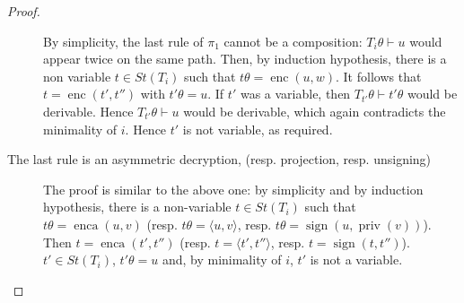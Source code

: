 \documentclass[acmtocl,acmnow]{acmtrans2m}
\newcommand{\pair}[2]{\langle{#1},{#2}\rangle}
\newcommand{\st}{\mathit{St}}
\newcommand{\penc}[2]{\operatorname{enc}(#1,#2)}
\newcommand{\enca}{\operatorname{enca}}
\newcommand{\sign}{\operatorname{sign}}
\newcommand{\pub}[1]{#1}
\newcommand{\priv}{\operatorname{priv}}
\begin{document}
\begin{proof}
\begin{description}
By simplicity, the last rule of $\pi_1$ cannot be a composition:
$T_i\theta\vdash u$ would appear twice on the same path.
Then, by induction hypothesis, there is a non variable $t\in \st(T_i)$
such that $t\theta=\penc{u}{w}$. It follows that
$t=\penc{t'}{t''}$ with $t'\theta=u$. If $t'$ was a
variable, then $T_{t'}\theta\vdash t'\theta$ would be derivable. 
Hence  $T_{t'}\theta\vdash u$ would be derivable, which again contradicts the
minimality of $i$. Hence $t'$ is not variable, as required.
\item[The last rule is an asymmetric decryption, (resp. projection, resp. unsigning)]
The proof is similar to the above one:
 by simplicity and by induction hypothesis, there is a non-variable
$t\in \st(T_i)$ such that $t\theta = \enca(u,\pub{v})$ (resp. $t\theta=\pair{u}{v}$, resp. $t\theta=\sign(u,\priv(v))$). 
Then $t= \enca(t',t'')$ (resp. $t=\pair{t'}{t''}$, resp. $t= \sign(t,t'')$).
$t'\in \st(T_i)$, $t'\theta=u$ and, by minimality of $i$, $t'$ is not a variable.
\end{description}
\end{proof}
\end{document}
